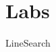 \documentclass[nociteref]{SIAM-GH-book}
\begin{document}
\part{Labs}
%
%
%
%
%
%
%
%
%
%
%


{LineSearch}
%
%
%
%
%
\end{document}
